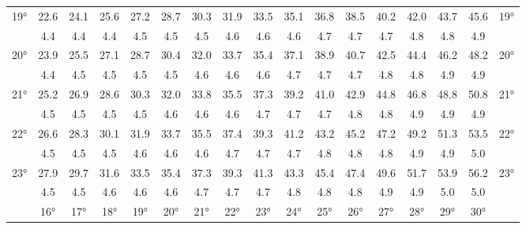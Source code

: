 \begin{scriptsize}
\begin{tabular}{c || c | c | c | c | c | c | c | c | c | c | c | c | c | c | c || c}
		\multirow{2}{*}{19°}&22.6&24.1&25.6&27.2&28.7&30.3&31.9&33.5&35.1&36.8&38.5&40.2&42.0&43.7&45.6&\multirow{2}{*}{19°}\\ \space&4.4&4.4&4.4&4.5&4.5&4.5&4.6&4.6&4.6&4.7&4.7&4.7&4.8&4.8&4.9&\space\\\hline
		\multirow{2}{*}{20°}&23.9&25.5&27.1&28.7&30.4&32.0&33.7&35.4&37.1&38.9&40.7&42.5&44.4&46.2&48.2&\multirow{2}{*}{20°}\\ \space&4.4&4.5&4.5&4.5&4.5&4.6&4.6&4.6&4.7&4.7&4.7&4.8&4.8&4.9&4.9&\space\\\hline
		\multirow{2}{*}{21°}&25.2&26.9&28.6&30.3&32.0&33.8&35.5&37.3&39.2&41.0&42.9&44.8&46.8&48.8&50.8&\multirow{2}{*}{21°}\\ \space&4.5&4.5&4.5&4.5&4.6&4.6&4.6&4.7&4.7&4.7&4.8&4.8&4.9&4.9&4.9&\space\\\hline
		\multirow{2}{*}{22°}&26.6&28.3&30.1&31.9&33.7&35.5&37.4&39.3&41.2&43.2&45.2&47.2&49.2&51.3&53.5&\multirow{2}{*}{22°}\\ \space&4.5&4.5&4.5&4.6&4.6&4.6&4.7&4.7&4.7&4.8&4.8&4.8&4.9&4.9&5.0&\space\\\hline
		\multirow{2}{*}{23°}&27.9&29.7&31.6&33.5&35.4&37.3&39.3&41.3&43.3&45.4&47.4&49.6&51.7&53.9&56.2&\multirow{2}{*}{23°}\\ \space&4.5&4.5&4.6&4.6&4.6&4.7&4.7&4.7&4.8&4.8&4.8&4.9&4.9&5.0&5.0&\space\\\hline
		\hline\space &16°&17°&18°&19°&20°&21°&22°&23°&24°&25°&26°&27°&28°&29°&30°
\end{tabular}\end{scriptsize}


